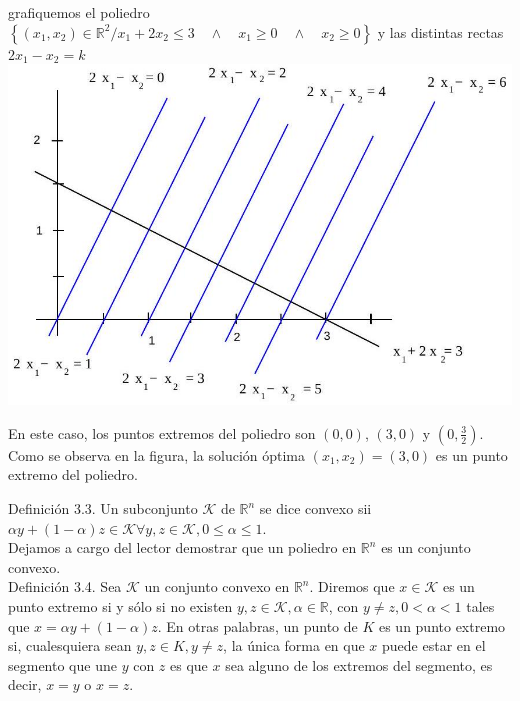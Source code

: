 \documentclass[10pt]{article}
\begin{document}
grafiquemos el poliedro $\left\{\left(x_{1}, x_{2}\right) \in \mathbb{R}^{2} / x_{1}+2 x_{2} \leq 3 \quad \wedge \quad x_{1} \geq 0 \quad \wedge \quad x_{2} \geq 0\right\}$ y las distintas rectas $2 x_{1}-x_{2}=k$\\
\includegraphics[max width=\textwidth, center]{2025_09_05_b12b6a6e1ba506f51b40g-04}

En este caso, los puntos extremos del poliedro son $(0,0)$, $(3,0)$ y $\left(0, \frac{3}{2}\right)$. Como se observa en la figura, la solución óptima $\left(x_{1}, x_{2}\right)=(3,0)$ es un punto extremo del poliedro.

Definición 3.3. Un subconjunto $\mathcal{K}$ de $\mathbb{R}^{n}$ se dice convexo sii $\alpha y+(1-\alpha) z \in \mathcal{K} \forall y, z \in \mathcal{K}, 0 \leq \alpha \leq 1$.\\
Dejamos a cargo del lector demostrar que un poliedro en $\mathbb{R}^{n}$ es un conjunto convexo.\\
Definición 3.4. Sea $\mathcal{K}$ un conjunto convexo en $\mathbb{R}^{n}$. Diremos que $x \in \mathcal{K}$ es un punto extremo si y sólo si no existen $y, z \in \mathcal{K}, \alpha \in \mathbb{R}$, con $y \neq z, 0<\alpha<1$ tales que $x=\alpha y+(1-\alpha) z$. En otras palabras, un punto de $K$ es un punto extremo si, cualesquiera sean $y, z \in K, y \neq z$, la única forma en que $x$ puede estar en el segmento que une $y$ con $z$ es que $x$ sea alguno de los extremos del segmento, es decir, $x=y$ o $x=z$.
\end{document}
